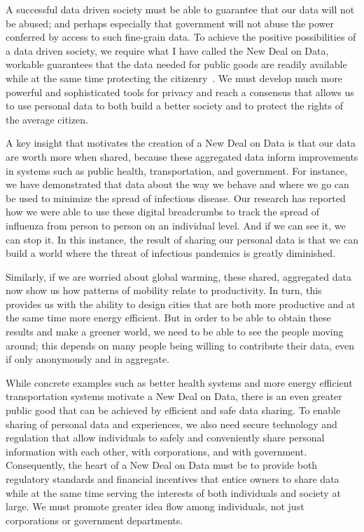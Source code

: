 A successful data driven society must be able to guarantee that our data will not be abused; and perhaps especially that government will not abuse the power conferred by access to such fine-grain data.
To achieve the positive possibilities of a data driven society, we require what I have called the New Deal on Data, workable guarantees that the data needed for public goods are readily available while at the same time protecting the citizenry~\cite{pentland2009reality}.
We must develop much more powerful and sophisticated tools for privacy and reach a consensus that allows us to use personal data to both build a better society and to protect the rights of the average citizen.

A key insight that motivates the creation of a New Deal on Data is that our data are worth more when shared, because these aggregated data inform improvements in systems such as public health, transportation, and government.
For instance, we have demonstrated that data about the way we behave and where we go can be used to minimize the spread of infectious disease. 
Our research has reported how we were able to use these digital breadcrumbs to track the spread of influenza from person to person on an individual level.
And if we can see it, we can stop it. In this instance, the result of sharing our personal data is that we can build a world where the threat of infectious pandemics is greatly diminished.

Similarly, if we are worried about global warming, these shared, aggregated data now show us how patterns of mobility relate to productivity. 
In turn, this provides us with the ability to design cities that are both more productive and at the same time more energy efficient.
But in order to be able to obtain these results and make a greener world, we need to be able to see the people moving around; this depends on many people being willing to contribute their data, even if only anonymously and in aggregate.

While concrete examples such as better health systems  and more energy efficient transportation systems  motivate a New Deal on Data, there is an even greater public good that can be achieved by efficient and safe data sharing.
To enable sharing of personal data and experiences, we also need secure technology and regulation that allow individuals to safely and conveniently share personal information with each other, with corporations, and with government.
Consequently, the heart of a New Deal on Data must be to provide both regulatory standards and financial incentives that entice owners to share data while at the same time serving the interests of both individuals and society at large.
We must promote greater idea flow among individuals, not just corporations or government departments.

